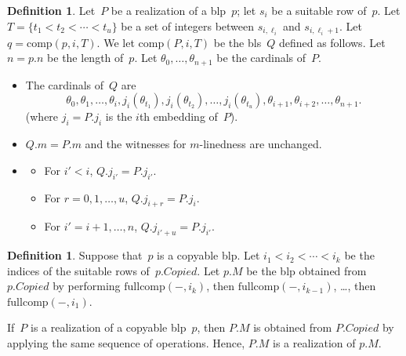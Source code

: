 \documentclass{article}
\theoremstyle{definition}
\newtheorem{definition}[lemma]{Definition}
\theoremstyle{remark}
\begin{document}
\begin{definition} \label{def:fullcomp_for_bls}
  Let~$P$ be a realization of a blp~$p$; let $s_i$ be a suitable row of~$p$. Let $T = \{t_1< t_2< \cdots <t_u\}$ be a set of integers between $s_{i,\ell_i}$ and $s_{i,\ell_i+1}$. Let $q = \mathrm{comp}(p,i,T)$. We let $\mathrm{comp}(P,i,T)$ be the bls~$Q$ defined as follows. Let $n = p.n$ be the length of~$p$. Let $\theta_0, \dots, \theta_{n+1}$ be the cardinals of~$P$. 
  \begin{itemize}
    \item The cardinals of~$Q$ are 
     \[
     \theta_0,\theta_1,\dots, \theta_i, j_i(\theta_{t_1}), j_i(\theta_{t_2}), \dots, j_i(\theta_{t_u}), \theta_{i+1}, \theta_{i+2},\dots, \theta_{n+1}. 
     \]
     (where $j_i = P.j_i$ is the $i$th embedding of~$P$). 

     \item $Q.m = P.m$ and the witnesses for $m$-linedness are unchanged. 

     \item \begin{itemize}
       \item For $i'<i$, $Q.j_{i'} = P.j_{i'}$. 
       \item For $r = 0,1,\dots, u$, $Q.j_{i+r} = P.j_i$. 
       \item For $i' = i+1,\dots, n$, $Q.j_{i'+u} = P.j_{i'}$. 
     \end{itemize}
  \end{itemize}
\end{definition}





\begin{definition} \label{def:modification_operation}
  Suppose that~$p$ is a copyable blp. Let $i_1< i_2 < \cdots < i_k$ be the indices of the suitable rows of~$p.Copied$. Let $p.M$ be the blp obtained from $p.Copied$ by performing $\mathrm{fullcomp}(-,i_k)$, then $\mathrm{fullcomp}(-,i_{k-1})$, \dots, then $\mathrm{fullcomp}(-,i_{1})$. 

  If~$P$ is a realization of a copyable blp~$p$, then $P.M$ is obtained from $P.Copied$ by applying the same sequence of operations. Hence, $P.M$ is a realization of $p.M$. 
\end{definition}
\end{document}
